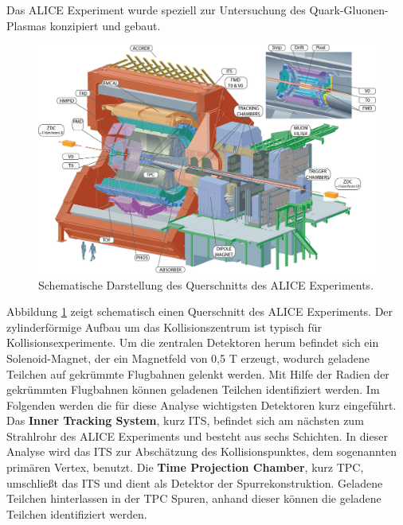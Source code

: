 Das ALICE Experiment wurde speziell zur Untersuchung des Quark-Gluonen-Plasmas konzipiert und gebaut.
\begin{figure}[thp]
\centering
\includegraphics[width=.9\linewidth]{ALICE.jpg}
\caption{Schematische Darstellung des Querschnitts des ALICE Experiments.
\cite{WEBSITE:1}}
\label{fig:ALICE}
\end{figure}
Abbildung \ref{fig:ALICE} zeigt schematisch einen Querschnitt des ALICE Experiments. Der zylinderf\"ormige Aufbau um das Kollisionszentrum ist typisch f\"ur Kollisionsexperimente.
\newline
Um die zentralen Detektoren herum befindet sich ein Solenoid-Magnet, der ein Magnetfeld von 0,5 T erzeugt, wodurch geladene Teilchen auf gekr\"ummte Flugbahnen gelenkt werden.
Mit Hilfe der Radien der gekr\"ummten Flugbahnen k\"onnen geladenen Teilchen identifiziert werden.
Im Folgenden werden die f\"ur diese Analyse wichtigsten Detektoren kurz eingef\"uhrt.
\newline
Das \textbf{Inner Tracking System}, kurz ITS, befindet sich am n\"achsten zum Strahlrohr des ALICE Experiments und besteht aus sechs Schichten.
In dieser Analyse wird das ITS zur Absch\"atzung des Kollisionspunktes, dem sogenannten prim\"aren Vertex, benutzt.
\newline
Die \textbf{Time Projection Chamber}, kurz TPC, umschlie{\ss}t das ITS und dient als Detektor der Spurrekonstruktion.
Geladene Teilchen hinterlassen in der TPC Spuren, anhand dieser k\"onnen die geladene Teilchen identifiziert werden.
